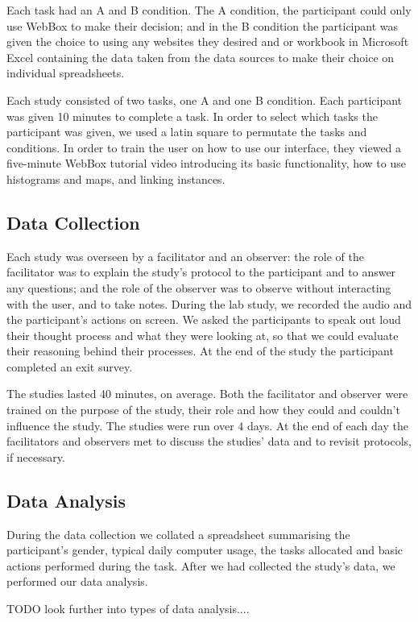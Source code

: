 \documentclass{sigchi}
\begin{document}
Each task had an A and B condition.  The A condition, the participant could only use WebBox to make their decision; and in the B condition the participant was given the choice to using any websites they desired and or workbook in Microsoft Excel containing the data taken from the data sources to make their choice on individual spreadsheets.

Each study consisted of two tasks, one A and one B condition.  Each participant was given 10 minutes to complete a task.  In order to select which tasks the participant was given, we used a latin square to permutate the tasks and conditions.  In order to train the user on how to use our interface, they viewed a five-minute WebBox tutorial video introducing its basic functionality, how to use histograms and maps, and linking instances.

\subsection{Data Collection}
Each study was overseen by a facilitator and an observer:  the role of the facilitator was to explain the study's protocol to the participant and to answer any questions; and the role of the observer was to observe without interacting with the user, and to take notes.  During the lab study, we recorded the audio and the participant's actions on screen. We asked the participants to speak out loud their thought process and what they were looking at, so that we could evaluate their reasoning behind their processes.  At the end of the study the participant completed an exit survey.  

The studies lasted 40 minutes, on average.  Both the facilitator and observer were trained on the purpose of the study, their role and how they could and couldn't influence the study.  The studies were run over 4 days.  At the end of each day the facilitators and observers met to discuss the studies' data and to revisit protocols, if necessary.

\subsection{Data Analysis}

During the data collection we collated a spreadsheet summarising the participant's gender, typical daily computer usage, the tasks allocated and basic actions performed during the task.  After we had collected the study's data, we performed our data analysis. 

TODO look further into types of data analysis....
\end{document}
